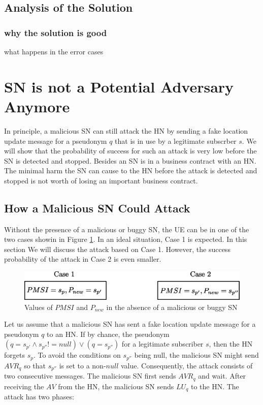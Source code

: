 \documentclass{llncs} %
\begin{document}
\subsection{Analysis of the Solution}
\subsubsection{why the solution is good}
what happens in the error cases

\section{SN is not a Potential Adversary Anymore}
In principle, a malicious SN can still attack the HN by sending a fake location update message for a pseudonym $q$ that is in use by a legitimate subscrber $s$. We will show that the probability of success for such an attack is very low before the SN is detected and stopped. Besides an SN is in a business contract with an HN. The minimal harm the SN can cause to the HN before the attack is detected and stopped is not worth of losing an important business contract. 

\subsection{How a Malicious SN Could Attack} \label{sec:attack_by_sn}
Without the presence of a malicious or buggy SN, the UE can be in one of the two cases showin in Figure \ref{fig:ue_cases}. In an ideal situation, Case 1 is expected. In this section We will discuss the attack based on Case 1. However, the success probability of the attack in Case 2 is even smaller.


\begin{figure}[]
  \centering
    \includegraphics[width=\textwidth]{UE_cases.eps}
  \caption{Values of $PMSI$ and $P_{new}$ in the absence of a malicious or buggy SN}
  \label{fig:ue_cases}	
\end{figure}


Let us assume that a malicious SN has sent a fake location update message for a pseudonym $q$ to an HN. If by chance, the pseudonym $\left(q = s_{p'} \land s_{p''}! = null\right) \vee \left( q = s_{p''}\right)$ for a legitimate subscriber $s$, then the HN forgets $s_p$. To avoid the conditions on $s_{p''}$ being null, the malicious SN might send $AVR_{q}$ so that $s_{p''}$ is set to a non-$null$ value. Consequently, the attack consists of two consecutive messages. The malicious SN first sends $AVR_q$ and wait. After receiving the $AV$ from the HN, the malicious SN sends $LU_{q}$ to the HN. The attack has two phases: 
\end{document}
